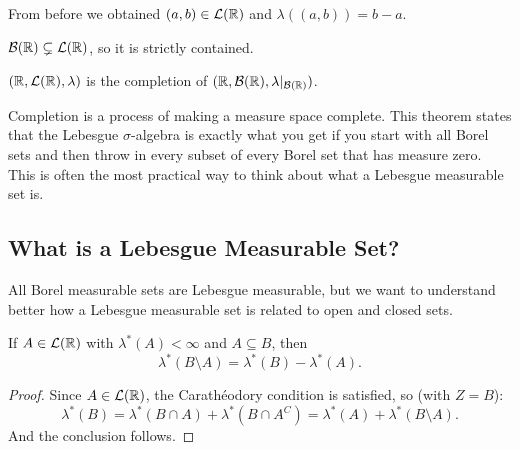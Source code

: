 \begin{remark}
From before we obtained $(a,b) \in \mathcal{L}(\mathbb{R})$ and $\lambda((a,b)) = b - a$.
\end{remark}

\begin{remark}
$\mathcal{B}(\mathbb{R}) \subsetneq \mathcal{L}(\mathbb{R})$, so it is strictly contained.
\end{remark}

\clearpage
\begin{theorem}
$(\mathbb{R}, \mathcal{L}(\mathbb{R}), \lambda)$ is the completion of $(\mathbb{R}, \mathcal{B}(\mathbb{R}), \lambda|_{\mathcal{B}(\mathbb{R})})$.
\end{theorem}

\begin{remark}
Completion is a process of making a measure space complete. This theorem states that the Lebesgue $\sigma$-algebra is exactly what you get if you start with all Borel sets and then throw in every subset of every Borel set that has measure zero. This is often the most practical way to think about what a Lebesgue measurable set is.
\end{remark}

\subsection{What is a Lebesgue Measurable Set?}
All Borel measurable sets are Lebesgue measurable, but we want to understand better how a Lebesgue measurable set is related to open and closed sets.

\begin{lemma}
If $A \in \mathcal{L}(\mathbb{R})$ with $\lambda^*(A) < \infty$ and $A \subseteq B$, then
\[
\lambda^*(B \setminus A) = \lambda^*(B) - \lambda^*(A).
\]
\end{lemma}

\begin{proof}
Since $A \in \mathcal{L}(\mathbb{R})$, the Carathéodory condition is satisfied, so (with $Z = B$):
\[
\lambda^*(B) = \lambda^*(B \cap A) + \lambda^*(B \cap A^C) = \lambda^*(A) + \lambda^*(B \setminus A).
\]
And the conclusion follows.
\end{proof}

